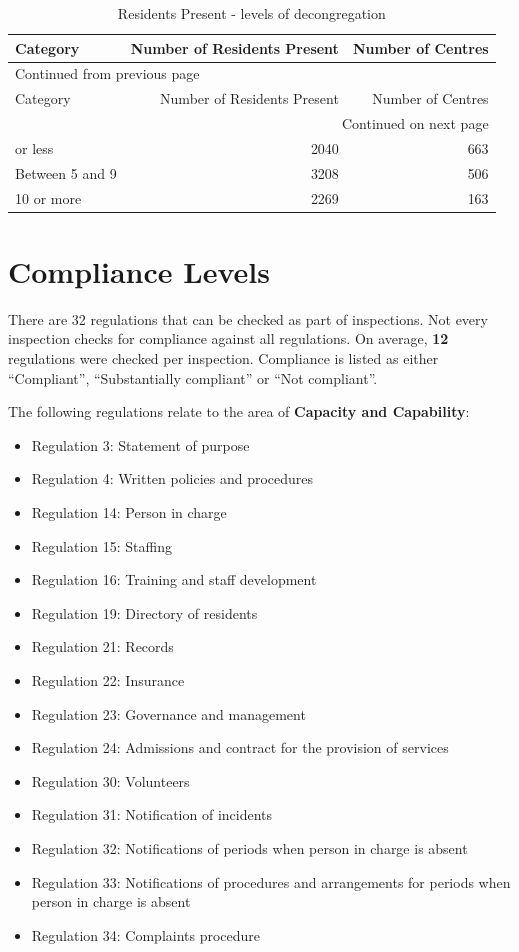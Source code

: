 \documentclass[a4paper,11pt,twoside]{article}
\begin{document}
\begin{longtable}{lrr}
\caption{Residents Present - levels of decongregation}
\\[0pt]
Category & Number of Residents Present & Number of Centres\\[0pt]
\hline
\endfirsthead
\multicolumn{3}{l}{Continued from previous page} \\[0pt]
\hline

Category & Number of Residents Present & Number of Centres \\[0pt]

\hline
\endhead
\hline\multicolumn{3}{r}{Continued on next page} \\
\endfoot
\endlastfoot
\hline
4 or less & 2040 & 663\\[0pt]
Between 5 and 9 & 3208 & 506\\[0pt]
10 or more & 2269 & 163\\[0pt]
\end{longtable}


\clearpage
\section{Compliance Levels}
\label{sec:orgd8c7dc8}
There are 32 regulations that can be checked as part of inspections. Not every inspection checks for compliance against all regulations. On average, \textbf{12} regulations were checked per inspection. Compliance is listed as either ``Compliant'', ``Substantially compliant'' or ``Not compliant''.

The following regulations relate to the area of \textbf{Capacity and Capability}:

\begin{itemize}
\item Regulation 3: Statement of purpose
\item Regulation 4: Written policies and procedures
\item Regulation 14: Person in charge
\item Regulation 15: Staffing
\item Regulation 16: Training and staff development
\item Regulation 19: Directory of residents
\item Regulation 21: Records
\item Regulation 22: Insurance
\item Regulation 23: Governance and management
\item Regulation 24: Admissions and contract for the provision of services
\item Regulation 30: Volunteers
\item Regulation 31: Notification of incidents
\item Regulation 32: Notifications of periods when person in charge is absent
\item Regulation 33: Notifications of procedures and arrangements for periods when person in charge is absent
\item Regulation 34: Complaints procedure
\end{itemize}
\end{document}
